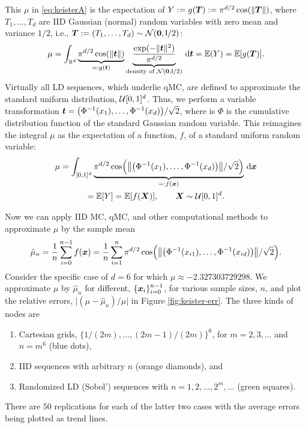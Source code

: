 \documentclass{svproc}
\begin{document}
This $\mu$ in \eqref{eq:keisterA} is the expectation of $Y := g({\boldsymbol{T}}) := \pi^{d/2} \cos(\lVert {\boldsymbol{T}} \rVert)$, where $T_1, \ldots, T_d$ are IID Gaussian (normal) random variables with zero mean and variance $1/2$, i.e., ${\boldsymbol{T}} :=(T_1, \ldots, T_d) \sim {\mathcal{N}}({\boldsymbol{0}},\mathsf{I}/2)$:
\begin{equation}\label{eq:keisterB}
	\mu = \int_{\mathbb{R}^d} \underbrace{\pi^{d/2} \cos(\lVert {\boldsymbol{t}} \rVert)}_{=:g({\boldsymbol{t}})}  \underbrace{\frac{\exp(-\lVert {\boldsymbol{t}} \rVert^2)}{\pi^{d/2}}}_{\text{density of } {\mathcal{N}}({\boldsymbol{0}},\mathsf{I}/2)} \, {\mathrm{d}} {\boldsymbol{t}} = {\mathbb{E}}(Y) = {\mathbb{E}}[g({\boldsymbol{T}})].
\end{equation}
Virtually all LD sequences, which underlie qMC, are defined to approximate the standard uniform distribution, ${\mathcal{U}}[0,1]^d$.  Thus, we perform a variable transformation ${\boldsymbol{t}} = \bigl (\Phi^{-1}(x_1), \ldots, \Phi^{-1}(x_d) \bigr )/\sqrt{2}$,
where is $\Phi$ is the cumulative distribution function of the standard Gaussian random variable.  This reimagines the integral $\mu$ as the expectation of a function, $f$, of a standard uniform random variable:
\begin{multline}\label{eq:keisterC}
	\mu = \int_{[0,1]^d} \underbrace{\pi^{d/2} \cos\Bigl (\bigl \lVert \bigl( \Phi^{-1}(x_1), \ldots, \Phi^{-1}(x_d)\bigr) \bigr\rVert/\sqrt{2}  \Bigr)}_{=:f({\boldsymbol{x}})} \, {\mathrm{d}} {\boldsymbol{x}} \\
	= {\mathbb{E}}[Y]
	= {\mathbb{E}}[f({\boldsymbol{X}})], \qquad {\boldsymbol{X}} \sim {\mathcal{U}}[0,1]^d.
\end{multline}

Now we can apply IID MC, qMC, and other computational methods to approximate $\mu$ by the sample mean
\begin{equation} \label{eq:sample_mean_Keister}
	\hat{\mu}_n = \frac 1n \sum_{i=0}^{n-1} f ({\boldsymbol{x}}) = \frac 1n \sum_{i=1}^n \pi^{d/2} \cos\Bigl (\bigl \lVert \bigl( \Phi^{-1}(x_{i1}), \ldots, \Phi^{-1}(x_{id})\bigr) \bigr\rVert/\sqrt{2}  \Bigr).
\end{equation}
Consider the specific case of $d=6$ for which $\mu \approx -2.327303729298$.  We approximate $\mu$ by $\hat{\mu}_n$ for different, $\{{\boldsymbol{x}}_i\}_{i=0}^{n-1}$, for various sample sizes, $n$, and plot the relative errors, $\lvert (\mu - 	\hat{\mu}_n)/\mu\rvert$ in Figure \ref{fig:keister-err}. The three kinds of nodes are
\begin{enumerate}
	\renewcommand{\labelenumi}{\roman{enumi}.}
	\item Cartesian grids, $\{1/(2m), \ldots, (2m-1)/(2m) \}^6$, for $m = 2, 3, \ldots$ and $n = m^6$ (blue dots),
	\item IID sequences with arbitrary $n$ (orange diamonds), and
	\item Randomized LD (Sobol') sequences with $n = 1, 2, \ldots, 2^m, \ldots $ (green squares).
\end{enumerate}
There are $50$ replications for each of the latter two cases with the average errors being plotted as trend lines.
\end{document}

